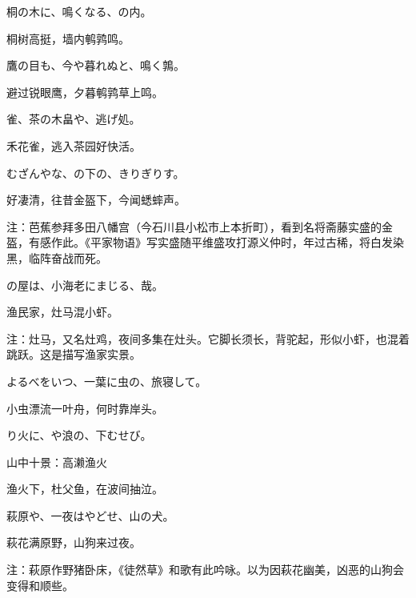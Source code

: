 \begin{haiku}
    {\FH 桐の木に、鳴くなる、の内。}

    {\FK 桐树高挺，墙内鹌鹑鸣。}
\end{haiku}

\begin{haiku}
    {\FH 鷹の目も、今や暮れぬと、鳴く鶉。}

    {\FK 避过锐眼鹰，夕暮鹌鹑草上鸣。}
\end{haiku}

\begin{haiku}
    {\FH {}雀、茶の木畠や、逃げ処。}

    {\FK 禾花雀，逃入茶园好快活。}
\end{haiku}

\begin{haiku}
    {\FH むざんやな、の下の、きりぎりす。}

    {\FK 好凄清，往昔金盔下，今闻蟋蟀声。}

    {\FT 注：芭蕉参拜多田八幡宫（今石川县小松市上本折町），看到名将斋藤实盛的金盔，有感作此。《平家物语》写实盛随平维盛攻打源义仲时，年过古稀，将白发染黑，临阵奋战而死。}
\end{haiku}

\begin{haiku}
    {\FH {}の屋は、小海老にまじる、哉。}

    {\FK 渔民家，灶马混小虾。}

    {\FT 注：灶马，又名灶鸡，夜间多集在灶头。它脚长须长，背驼起，形似小虾，也混着跳跃。这是描写渔家实景。}
\end{haiku}

\begin{haiku}
    {\FH よるべをいつ、一葉に虫の、旅寝して。}

    {\FK 小虫漂流一叶舟，何时靠岸头。}
\end{haiku}

\begin{haiku}
    {\FH {}り火に、や浪の、下むせび。}

    {\FK 山中十景：高濑渔火}

    {\FK 渔火下，杜父鱼，在波间抽泣。}
\end{haiku}

\begin{haiku}
    {\FH 萩原や、一夜はやどせ、山の犬。}

    {\FK 萩花满原野，山狗来过夜。}

    {\FT 注：萩原作野猪卧床，《徒然草》和歌有此吟咏。以为因萩花幽美，凶恶的山狗会变得和顺些。}
\end{haiku}

